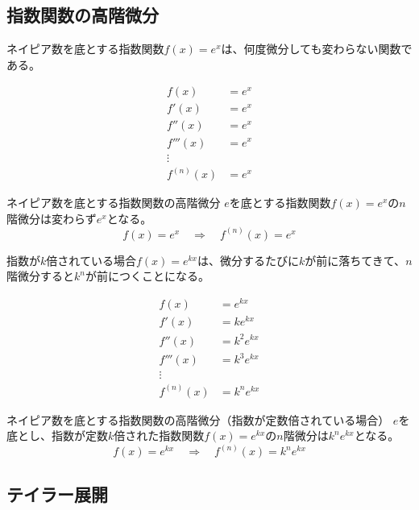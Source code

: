 \documentclass[../math-imaging]{subfiles}
\begin{document}
\subsection{指数関数の高階微分}

ネイピア数を底とする指数関数$f(x)=e^x$は、何度微分しても変わらない関数である。

\begin{align}
  f(x)       & = e^x \\
  f'(x)      & = e^x \\
  f''(x)     & = e^x \\
  f'''(x)    & = e^x \\
  \vdots     &       \\
  f^{(n)}(x) & = e^x
\end{align}

\begin{theorem}{ネイピア数を底とする指数関数の高階微分}
  \newline
  $e$を底とする指数関数$f(x) = e^x$の$n$階微分は変わらず$e^x$となる。
  \LARGE
  \begin{equation}
    f(x) = e^{x} \quad \Longrightarrow \quad f^{(n)}(x) = e^{x}
  \end{equation}
\end{theorem}

指数が$k$倍されている場合$f(x)=e^{kx}$は、微分するたびに$k$が前に落ちてきて、$n$階微分すると$k^n$が前につくことになる。

\begin{align}
  f(x)       & = e^{kx}     \\
  f'(x)      & = ke^{kx}    \\
  f''(x)     & = k^2 e^{kx} \\
  f'''(x)    & = k^3 e^{kx} \\
  \vdots     &              \\
  f^{(n)}(x) & = k^ne^{kx}
\end{align}

\begin{theorem}{ネイピア数を底とする指数関数の高階微分（指数が定数倍されている場合）}
  \newline
  $e$を底とし、指数が定数$k$倍された指数関数$f(x) = e^{kx}$の$n$階微分は$k^n e^{kx}$となる。
  \LARGE
  \begin{equation}
    f(x) = e^{kx} \quad \Longrightarrow \quad f^{(n)}(x) = k^n e^{kx}
  \end{equation}
\end{theorem}

\subsection{テイラー展開}
\end{document}
